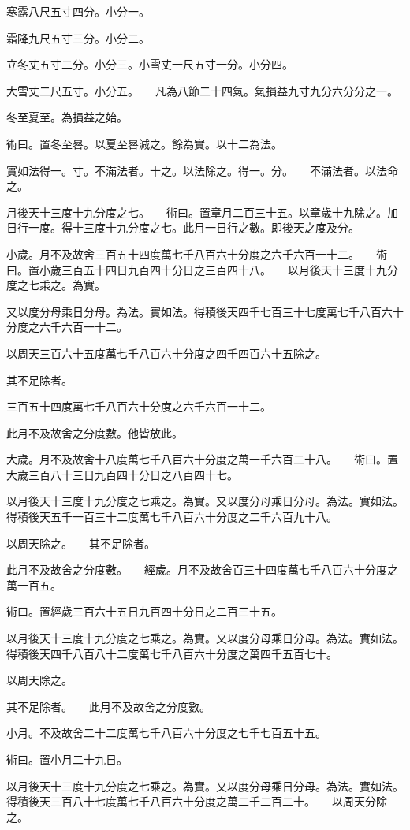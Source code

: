 \documentclass[a4paper,12pt,UTF8,twoside]{ctexbook}
\begin{document}
寒露八尺五寸四分。小分一。

霜降九尺五寸三分。小分二。

立冬丈五寸二分。小分三。小雪丈一尺五寸一分。小分四。

大雪丈二尺五寸。小分五。　　凡為八節二十四氣。氣損益九寸九分六分分之一。

冬至夏至。為損益之始。

術曰。置冬至晷。以夏至晷減之。餘為實。以十二為法。

實如法得一。寸。不滿法者。十之。以法除之。得一。分。　　不滿法者。以法命之。

月後天十三度十九分度之七。　　術曰。置章月二百三十五。以章歲十九除之。加日行一度。得十三度十九分度之七。此月一日行之數。即後天之度及分。

小歲。月不及故舍三百五十四度萬七千八百六十分度之六千六百一十二。　　術曰。置小歲三百五十四日九百四十分日之三百四十八。　　以月後天十三度十九分度之七乘之。為實。

又以度分母乘日分母。為法。實如法。得積後天四千七百三十七度萬七千八百六十分度之六千六百一十二。

以周天三百六十五度萬七千八百六十分度之四千四百六十五除之。

其不足除者。

三百五十四度萬七千八百六十分度之六千六百一十二。

此月不及故舍之分度數。他皆放此。

大歲。月不及故舍十八度萬七千八百六十分度之萬一千六百二十八。　　術曰。置大歲三百八十三日九百四十分日之八百四十七。

以月後天十三度十九分度之七乘之。為實。又以度分母乘日分母。為法。實如法。得積後天五千一百三十二度萬七千八百六十分度之二千六百九十八。

以周天除之。　　其不足除者。

此月不及故舍之分度數。　　經歲。月不及故舍百三十四度萬七千八百六十分度之萬一百五。

術曰。置經歲三百六十五日九百四十分日之二百三十五。

以月後天十三度十九分度之七乘之。為實。又以度分母乘日分母。為法。實如法。得積後天四千八百八十二度萬七千八百六十分度之萬四千五百七十。

以周天除之。

其不足除者。　　此月不及故舍之分度數。

小月。不及故舍二十二度萬七千八百六十分度之七千七百五十五。

術曰。置小月二十九日。

以月後天十三度十九分度之七乘之。為實。又以度分母乘日分母。為法。實如法。得積後天三百八十七度萬七千八百六十分度之萬二千二百二十。　　以周天分除之。
\end{document}
